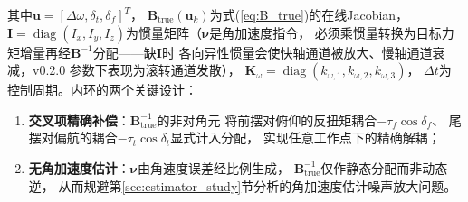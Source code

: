 其中$\mathbf{u}=[\Delta\omega,\delta_t,\delta_f]^T$，
$\mathbf{B}_{\mathrm{true}}(\mathbf{u}_k)$为式(\ref{eq:B_true})的在线Jacobian，
$\mathbf{I}=\operatorname{diag}(I_x,I_y,I_z)$为惯量矩阵（$\boldsymbol{\nu}$是角加速度指令，
必须乘惯量转换为目标力矩增量再经$\mathbf{B}^{-1}$分配——缺$\mathbf{I}$时
各向异性惯量会使快轴通道被放大、慢轴通道衰减，v0.2.0 参数下表现为滚转通道发散），
$\mathbf{K}_\omega=\operatorname{diag}(k_{\omega,1},k_{\omega,2},k_{\omega,3})$，
$\Delta t$为控制周期。内环的两个关键设计：

\begin{enumerate}[label=(\arabic*)]
    \item \textbf{交叉项精确补偿}：$\mathbf{B}_{\mathrm{true}}^{-1}$的非对角元
          将前摆对俯仰的反扭矩耦合$-\tau_f\cos\delta_f$、
          尾摆对偏航的耦合$-\tau_t\cos\delta_t$显式计入分配，
          实现任意工作点下的精确解耦；
    \item \textbf{无角加速度估计}：$\boldsymbol{\nu}$由角速度误差经比例生成，
          $\mathbf{B}_{\mathrm{true}}^{-1}$仅作静态分配而非动态逆，
          从而规避第\ref{sec:estimator_study}节分析的角加速度估计噪声放大问题。
\end{enumerate}

